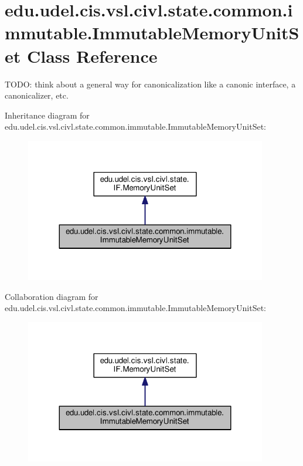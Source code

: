 \hypertarget{classedu_1_1udel_1_1cis_1_1vsl_1_1civl_1_1state_1_1common_1_1immutable_1_1ImmutableMemoryUnitSet}{}\section{edu.\+udel.\+cis.\+vsl.\+civl.\+state.\+common.\+immutable.\+Immutable\+Memory\+Unit\+Set Class Reference}
\label{classedu_1_1udel_1_1cis_1_1vsl_1_1civl_1_1state_1_1common_1_1immutable_1_1ImmutableMemoryUnitSet}


T\+O\+D\+O\+: think about a general way for canonicalization like a canonic interface, a canonicalizer, etc.  




Inheritance diagram for edu.\+udel.\+cis.\+vsl.\+civl.\+state.\+common.\+immutable.\+Immutable\+Memory\+Unit\+Set\+:
\nopagebreak
\begin{figure}[H]
\begin{center}
\leavevmode
\includegraphics[width=299pt]{classedu_1_1udel_1_1cis_1_1vsl_1_1civl_1_1state_1_1common_1_1immutable_1_1ImmutableMemoryUnitSet__inherit__graph}
\end{center}
\end{figure}


Collaboration diagram for edu.\+udel.\+cis.\+vsl.\+civl.\+state.\+common.\+immutable.\+Immutable\+Memory\+Unit\+Set\+:
\nopagebreak
\begin{figure}[H]
\begin{center}
\leavevmode
\includegraphics[width=299pt]{classedu_1_1udel_1_1cis_1_1vsl_1_1civl_1_1state_1_1common_1_1immutable_1_1ImmutableMemoryUnitSet__coll__graph}
\end{center}
\end{figure}
